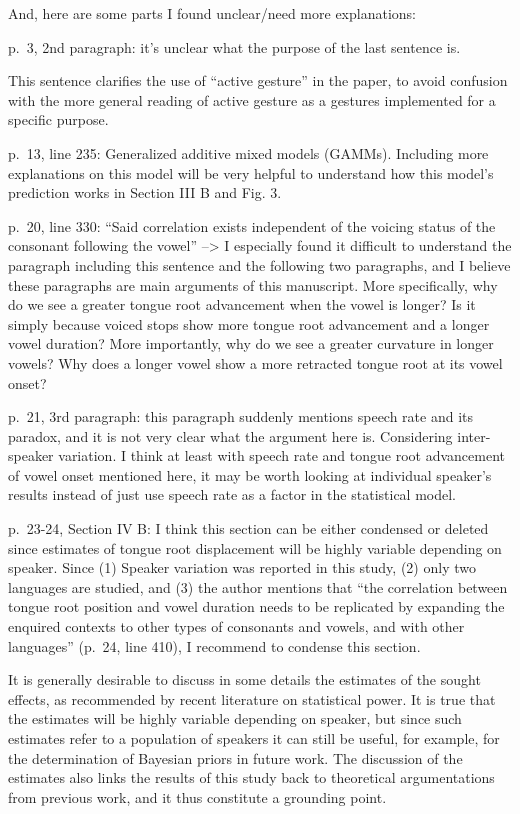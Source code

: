 \documentclass[]{article}
\begin{document}
And, here are some parts I found unclear/need more explanations:

p.~3, 2nd paragraph: it's unclear what the purpose of the last sentence
is.

\color{plum}

This sentence clarifies the use of ``active gesture'' in the paper, to
avoid confusion with the more general reading of active gesture as a
gestures implemented for a specific purpose. \color{black}

p.~13, line 235: Generalized additive mixed models (GAMMs). Including
more explanations on this model will be very helpful to understand how
this model's prediction works in Section III B and Fig. 3.

p.~20, line 330: ``Said correlation exists independent of the voicing
status of the consonant following the vowel'' --\textgreater{} I
especially found it difficult to understand the paragraph including this
sentence and the following two paragraphs, and I believe these
paragraphs are main arguments of this manuscript. More specifically, why
do we see a greater tongue root advancement when the vowel is longer? Is
it simply because voiced stops show more tongue root advancement and a
longer vowel duration? More importantly, why do we see a greater
curvature in longer vowels? Why does a longer vowel show a more
retracted tongue root at its vowel onset?

p.~21, 3rd paragraph: this paragraph suddenly mentions speech rate and
its paradox, and it is not very clear what the argument here is.
Considering inter-speaker variation. I think at least with speech rate
and tongue root advancement of vowel onset mentioned here, it may be
worth looking at individual speaker's results instead of just use speech
rate as a factor in the statistical model.

p.~23-24, Section IV B: I think this section can be either condensed or
deleted since estimates of tongue root displacement will be highly
variable depending on speaker. Since (1) Speaker variation was reported
in this study, (2) only two languages are studied, and (3) the author
mentions that ``the correlation between tongue root position and vowel
duration needs to be replicated by expanding the enquired contexts to
other types of consonants and vowels, and with other languages'' (p.~24,
line 410), I recommend to condense this section.

\color{plum}

It is generally desirable to discuss in some details the estimates of
the sought effects, as recommended by recent literature on statistical
power. It is true that the estimates will be highly variable depending
on speaker, but since such estimates refer to a population of speakers
it can still be useful, for example, for the determination of Bayesian
priors in future work. The discussion of the estimates also links the
results of this study back to theoretical argumentations from previous
work, and it thus constitute a grounding point. \color{black}
\end{document}
